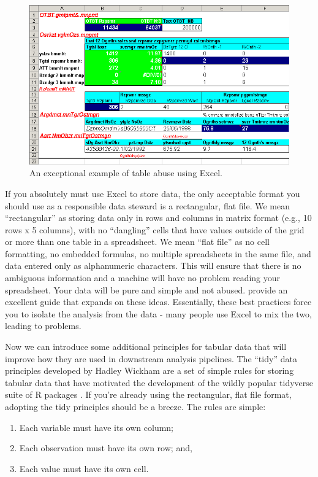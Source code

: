 \documentclass[
]{book}
\providecommand{\tightlist}{%
  \setlength{\itemsep}{0pt}\setlength{\parskip}{0pt}}
\begin{document}
\begin{figure}

{\centering \includegraphics[width=0.8\linewidth]{img/excel_bad} 

}

\caption{An exceptional example of table abuse using Excel.}\label{fig:excelbad}
\end{figure}

If you absolutely must use Excel to store data, the only acceptable format you should use as a responsible data steward is a rectangular, flat file. We mean ``rectangular'' as storing data only in rows and columns in matrix format (e.g., 10 rows x 5 columns), with no ``dangling'' cells that have values outside of the grid or more than one table in a spreadsheet. We mean ``flat file'' as no cell formatting, no embedded formulas, no multiple spreadsheets in the same file, and data entered only as alphanumeric characters. This will ensure that there is no ambiguous information and a machine will have no problem reading your spreadsheet. Your data will be pure and simple and not abused. \citet{Broman18} provide an excellent guide that expands on these ideas. Essentially, these best practices force you to isolate the analysis from the data - many people use Excel to mix the two, leading to problems.

Now we can introduce some additional principles for tabular data that will improve how they are used in downstream analysis pipelines. The ``tidy'' data principles developed by Hadley Wickham \citep{Wickham14c} are a set of simple rules for storing tabular data that have motivated the development of the wildly popular tidyverse suite of R packages \citep{Wickham19}. If you're already using the rectangular, flat file format, adopting the tidy principles should be a breeze. The rules are simple:

\begin{enumerate}
\def\labelenumi{\arabic{enumi}.}
\tightlist
\item
  Each variable must have its own column;
\item
  Each observation must have its own row; and,
\item
  Each value must have its own cell.
\end{enumerate}
\end{document}
